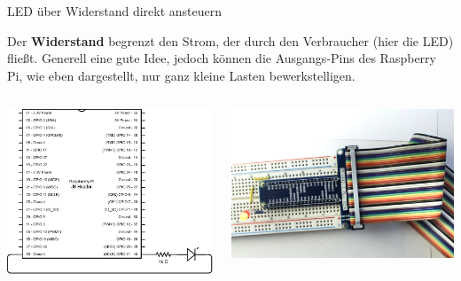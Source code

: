 {
\footnotesize

\begin{frame}{LED über Widerstand direkt ansteuern}
    \parbox{\linewidth}{
        Der \textbf{Widerstand} begrenzt den Strom, der durch den Verbraucher (hier die LED)
        fließt. Generell eine gute Idee, jedoch können die Ausgangs-Pins des Raspberry Pi,
        wie eben dargestellt, nur ganz kleine Lasten bewerkstelligen.
    }

    \bigskip

    \begin{columns}
        \includegraphics[width=\textwidth]{2-hardwaredesign/img/led_direkt_schaltplan}

        \includegraphics[width=\textwidth]{2-hardwaredesign/img/led_direkt_foto}
    \end{columns}
\end{frame}
}

